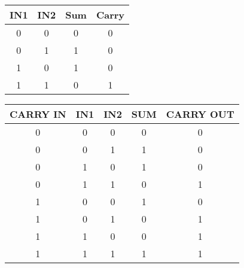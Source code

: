 \begin{tabular}{|c|c|c|c|}
    \hline 
    IN1 & IN2 & Sum & Carry \\ 
    \hline 
    0 & 0 & 0 & 0 \\ 
    \hline 
    0 & 1 & 1 & 0 \\ 
    \hline 
    1 & 0 & 1 & 0 \\ 
    \hline 
    1 & 1 & 0 & 1 \\ 
    \hline 
\end{tabular}

\begin{tabular}{|c|c|c|c|c|}
    \hline 
    CARRY IN & IN1 & IN2 & SUM & CARRY OUT \\ 
    \hline 
    0 & 0 & 0 & 0 & 0 \\ 
    \hline 
    0 & 0 & 1 & 1 & 0 \\ 
    \hline 
    0 & 1 & 0 & 1 & 0 \\ 
    \hline 
    0 & 1 & 1 & 0 & 1 \\ 
    \hline 
    1 & 0 & 0 & 1 & 0 \\ 
    \hline 
    1 & 0 & 1 & 0 & 1 \\ 
    \hline 
    1 & 1 & 0 & 0 & 1 \\ 
    \hline 
    1 & 1 & 1 & 1 & 1 \\ 
    \hline 
\end{tabular} 
